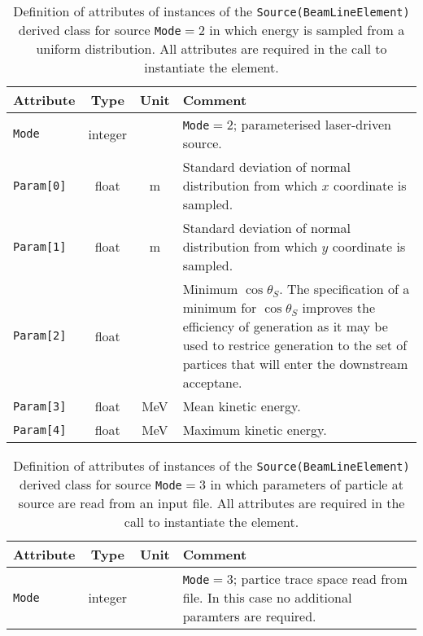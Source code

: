 \begin{table}[h]
  \caption{
    Definition of attributes of instances of
    the \texttt{Source(BeamLineElement)} derived class for
    source \texttt{Mode}$=2$ in which energy is sampled from a uniform
    distribution.
    All attributes are required in the call to instantiate the
    element.
  }
  \label{Tab:Source:AttributesC}
  \begin{center}
    \begin{tabular}{|l|c|c|p{10cm}|}
      \hline
      \textbf{Attribute} & \textbf{Type}      & \textbf{Unit} & \textbf{Comment}                    \\
      \hline
      \texttt{Mode}      & integer &          & \texttt{Mode}$=2$; parameterised laser-driven source.        \\
      \hline
       \texttt{Param[0]} & float   & m        & Standard deviation of normal distribution from which $x$ coordinate is sampled. \\
       \texttt{Param[1]} & float   & m        & Standard deviation of normal distribution from which $y$ coordinate is sampled. \\
       \texttt{Param[2]} & float   &          & Minimum $\cos\theta_S$.
                                                The specification of a minimum for $\cos\theta_S$ improves the efficiency of
                                                generation as it may be used to restrice generation to the set of partices that
                                                will enter the downstream acceptane.                                            \\
       \texttt{Param[3]} & float   & MeV      & Mean kinetic energy.                                          \\
       \texttt{Param[4]} & float   & MeV      & Maximum kinetic energy.            \\
      \hline
    \end{tabular}
  \end{center}
\end{table}
\begin{table}[h]
  \caption{
    Definition of attributes of instances of
    the \texttt{Source(BeamLineElement)} derived class for
    source \texttt{Mode}$=3$ in which parameters of particle at source
    are read from an input file.
    All attributes are required in the call to instantiate the
    element.
  }
  \label{Tab:Source:AttributesD}
  \begin{center}
    \begin{tabular}{|l|c|c|p{10cm}|}
      \hline
      \textbf{Attribute} & \textbf{Type}      & \textbf{Unit} & \textbf{Comment}                    \\
      \hline
      \texttt{Mode}      & integer &          & \texttt{Mode}$=3$; partice trace space read from file.
                                                In this case no additional paramters are required. \\
      \hline
    \end{tabular}
  \end{center}
\end{table}
